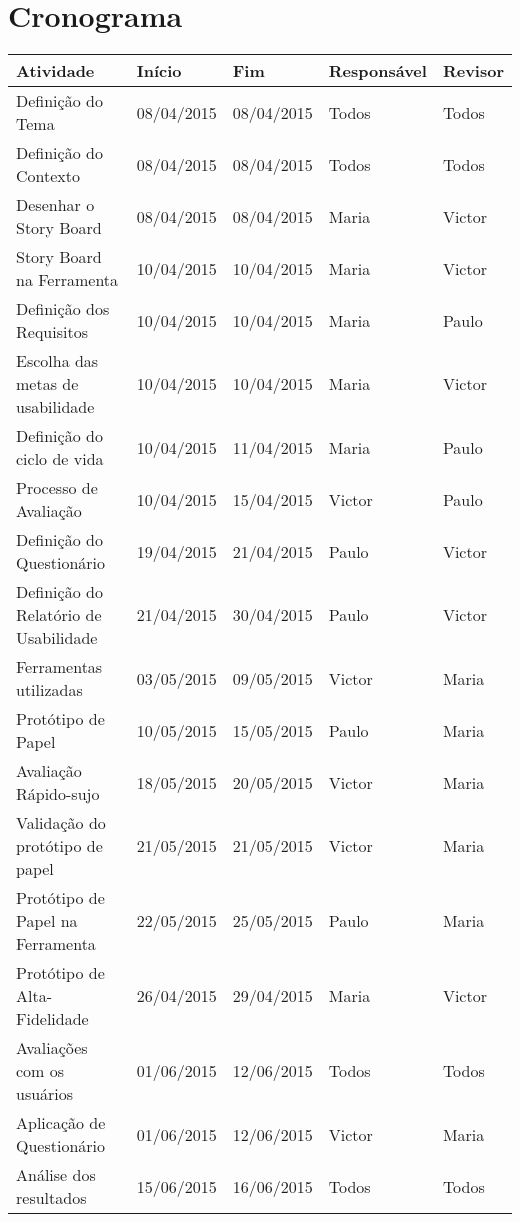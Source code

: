 \chapter[Cronograma]{Cronograma}

\begin{table}[h]
	\centering
	\begin{tabular}{@{}lllll@{}}
		\hline
		Atividade                       &    Início    &     Fim    & Responsável & Revisor \\ \hline
		Definição do Tema               &  08/04/2015  & 08/04/2015 & Todos       & Todos \\ \hline	
		Definição do Contexto           &  08/04/2015  & 08/04/2015 & Todos       & Todos \\ \hline	
		Desenhar o Story Board          &  08/04/2015  & 08/04/2015 & Maria       & Victor \\ \hline	
		Story Board na Ferramenta       &  10/04/2015  & 10/04/2015 & Maria       & Victor \\ \hline
		Definição dos Requisitos        &  10/04/2015  & 10/04/2015 & Maria       & Paulo \\ \hline	
		Escolha das metas de usabilidade&  10/04/2015  & 10/04/2015 & Maria       & Victor \\ \hline	
		Definição do ciclo de vida      &  10/04/2015  & 11/04/2015 & Maria       & Paulo \\ \hline	
		Processo de Avaliação           &  10/04/2015  & 15/04/2015 & Victor      & Paulo \\ \hline	
		Definição do Questionário       &  19/04/2015  & 21/04/2015 & Paulo       & Victor \\ \hline	
		Definição do Relatório de Usabilidade& 21/04/2015& 30/04/2015 & Paulo       & Victor \\ \hline	
		Ferramentas utilizadas          &  03/05/2015  & 09/05/2015 & Victor      & Maria \\ \hline
		Protótipo de Papel              &  10/05/2015  & 15/05/2015 & Paulo       & Maria \\ \hline	
		Avaliação Rápido-sujo           &  18/05/2015  & 20/05/2015 & Victor       & Maria \\ \hline	
		Validação do protótipo de papel &  21/05/2015  & 21/05/2015 & Victor       & Maria \\ \hline
		Protótipo de Papel na Ferramenta&  22/05/2015  & 25/05/2015 & Paulo       & Maria \\ \hline	
		Protótipo de Alta-Fidelidade    &  26/04/2015  & 29/04/2015 & Maria       & Victor \\ \hline	
		Avaliações com os usuários      &  01/06/2015  & 12/06/2015 & Todos       & Todos \\ \hline
		Aplicação de Questionário		&  01/06/2015  & 12/06/2015 & Victor		  & Maria \\ \hline	
		Análise dos resultados          &  15/06/2015  & 16/06/2015 & Todos       & Todos \\ \hline
		
	\end{tabular}
\end{table}




